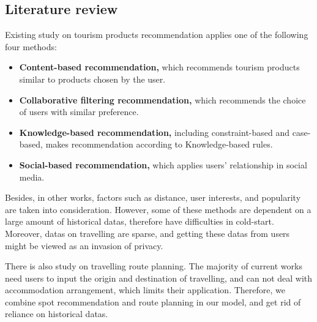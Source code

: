 \documentclass{mcmthesis}
\begin{document}
\subsection{Literature review}
  Existing study on tourism products recommendation applies one of the following four methods\cite{wen2014survey}:
  \begin{itemize}
    \item \textbf{Content-based recommendation,} which recommends tourism products similar to products chosen by the user.
    \item \textbf{Collaborative filtering recommendation,} which recommends the choice of users with similar preference.
    \item \textbf{Knowledge-based recommendation,} including constraint-based\cite{wang2012research} and case-based, makes recommendation according to Knowledge-based rules.
    \item \textbf{Social-based recommendation,} which applies users' relationship in social media.
  \end{itemize}
  Besides, in other works, factors such as distance\cite{Zhang2017GeoPMF}, user interests\cite{Qingxia2016Personalized}, and popularity\cite{li2016personalized} are taken into consideration. However, some of these methods are dependent on a large amount of historical datas, therefore have difficulties in cold-start. Moreover, datas on travelling are sparse, and getting these datas from users might be viewed as an invasion of privacy. \par
  There is also study on travelling route planning\cite{hao2015intellegent}. The majority of current works need users to input the origin and destination of travelling, and can not deal with accommodation arrangement, which limits their application. Therefore, we combine spot recommendation and route planning in our model, and get rid of reliance on historical datas.

  
\end{document}
